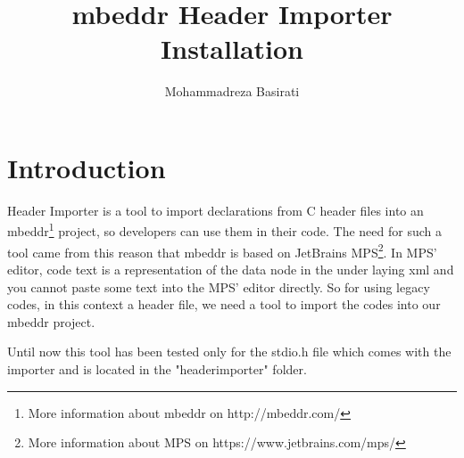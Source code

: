 \documentclass{article}
\begin{document}
\title{mbeddr Header Importer Installation}
\author{Mohammadreza Basirati}
\maketitle

\section{Introduction}
Header Importer is a tool to import declarations from C header files into an mbeddr\footnote{More information about mbeddr on http://mbeddr.com/} project, so developers can use them in their code.
The need for such a tool came from this reason that mbeddr is based on JetBrains MPS\footnote{More information about MPS on https://www.jetbrains.com/mps/}. In MPS' editor, code text is a representation of the data node in the under laying xml and you cannot paste some text into the MPS' editor directly. So for using legacy codes, in this context a header file, we need a tool to import the codes into our mbeddr project.

Until now this tool has been tested only for the stdio.h file which comes with the importer and is located in the "headerimporter" folder.
\end{document}
